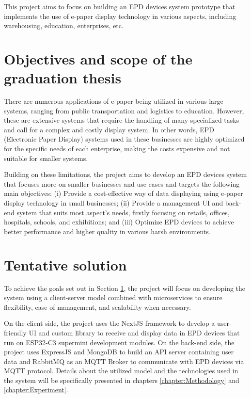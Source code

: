 \documentclass[../Main.tex]{subfiles}
\begin{document}
This project aims to focus on building an EPD devices system prototype that implements the use of e-paper display technology in various aspects, including warehousing, education, enterprises, etc.

\section{Objectives and scope of the graduation thesis}
\label{section:1.2}
There are numerous applications of e-paper being utilized in various large systems, ranging from public transportation and logistics to education. However, these are extensive systems that require the handling of many specialized tasks and call for a complex and costly display system. In other words, EPD (Electronic Paper Display) systems used in these businesses are highly optimized for the specific needs of each enterprise, making the costs expensive and not suitable for smaller systems.

Building on these limitations, the project aims to develop an EPD devices system that focuses more on smaller businesses and use cases and targets the following main objectives: (i) Provide a cost-effective way of data displaying using e-paper display technology in small businesses; (ii) Provide a management UI and back-end system that suits most aspect's needs, firstly focusing on retails, offices, hospitals, schools, and exhibitions; and (iii) Optimize EPD devices to achieve better performance and higher quality in various harsh environments.

\section{Tentative solution}
\label{section:1.3}
To achieve the goals set out in Section \ref{section:1.2}, the project will focus on developing the system using a client-server model combined with microservices to ensure flexibility, ease of management, and scalability when necessary. 

On the client side, the project uses the NextJS framework to develop a user-friendly UI and custom library to receive and display data in EPD devices that run on ESP32-C3 supermini development modules. On the back-end side, the project uses ExpressJS and MongoDB to build an API server containing user data and RabbitMQ as an MQTT Broker to communicate with EPD devices via MQTT protocol. Details about the utilized model and the technologies used in the system will be specifically presented in chapters \ref{chapter:Methodology} and \ref{chapter:Experiment}.
\end{document}
